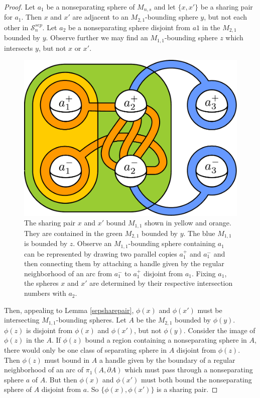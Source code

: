 \documentclass[11pt]{article}
\theoremstyle{remark}
\theoremstyle{definition}
\begin{document}
\begin{proof}
Let $a_1$ be a nonseparating sphere of $M_{n,s}$
and let $\{x,x'\}$ be a sharing pair for $a_1$.
Then $x$ and $x'$ are adjacent to an $M_{2,1}$-bounding sphere $y$,
but not each other in $\mathcal S^{sep}_{n}$.
Let $a_2$ be a nonseparating sphere disjoint from $a1$ in the $M_{2,1}$ bounded by $y$.
Observe further we may find an $M_{1,1}$-bounding sphere
$z$ which intersects $y$, but not $x$ or $x'$.
\begin{figure}
\includegraphics[width=.6\textwidth]{figures/sepsharepair.pdf}
\caption{
The sharing pair $x$ and $x'$ bound $M_{1,1}$ shown in yellow and orange.
They are contained in the green $M_{2,1}$ bounded by $y$.
The blue $M_{1,1}$ is bounded by $z$.
Observe an $M_{1,1}$-bounding sphere containing $a_1$ can be represented
by drawing two parallel copies $a^+_1$ and $a^-_1$ and then connecting them
by attaching a handle given by the regular neighborhood of an arc from $a_1^-$ to $a^+_1$ disjoint from $a_1$.
Fixing $a_1$, the spheres $x$ and $x'$ are determined by their respective intersection numbers with $a_2$.
}
\label{sepshare}
\end{figure}
Then, appealing to Lemma \ref{sepsharepair}, $\phi(x)$ and $\phi(x')$
must be intersecting $M_{1,1}$-bounding spheres.
Let $A$ be the $M_{2,1}$ bounded by $\phi(y)$.
$\phi(z)$ is disjoint from $\phi(x)$ and $\phi(x')$, but not $\phi(y)$.
Consider the image of $\phi(z)$ in the $A$.
If $\phi(z)$ bound a region containing a nonseparating sphere in
$A$, there would only be one class of separating sphere in $A$
disjoint from $\phi(z)$.
Then $\phi(z)$  must bound in $A$
a handle given by the boundary of a regular neighborhood of an arc of
$\pi_1(A,\partial A)$ which must pass through a nonseparating sphere $a$ of $A$.
But then $\phi(x)$ and $\phi(x')$ must both bound the nonseparating sphere of $A$ disjoint from $a$.
So $\{\phi(x),\phi(x')\}$ is a sharing pair.
\end{proof}
\end{document}
